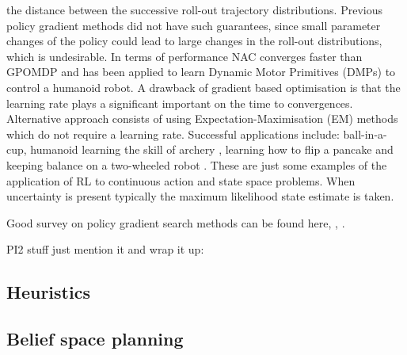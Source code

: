 the distance between the successive roll-out trajectory distributions. Previous policy gradient methods did not have such guarantees,
since small parameter changes of the policy could lead to large changes in the roll-out distributions, which is undesirable. In
terms of performance NAC converges faster than GPOMDP and has been applied to learn Dynamic Motor Primitives (DMPs) to control a 
humanoid robot. 
A drawback of gradient based optimisation is that the learning rate  plays a significant important on the time to convergences. 
Alternative approach consists of using Expectation-Maximisation (EM) methods \cite{PoWER_2009} which do not require a learning rate.
Successful applications include: ball-in-a-cup, humanoid learning the skill of archery \cite{archery_2010}, learning how to 
flip a pancake \cite{pancake_2010} and keeping balance on a two-wheeled robot \cite{Wang2016}. These are just some examples 
of the application of RL to continuous action and state space problems. When uncertainty is present typically the maximum likelihood
state estimate is taken.

Good survey on policy gradient search methods can be found here, \cite{p_search_surv_2011}, \cite{RL_robots_surv_2013}.

PI2 stuff just mention it and wrap it up: \cite{dmp_seq_2012} \cite{dmp_iros_2011} %







\subsection{Heuristics}

\cite{next_best_touch}
\cite{CostalNavigation1999}
\cite{dense_entropy_icra_2014}
\cite{Uncer_reduction_heuristic_2015} %
\subsection{Belief space planning}

